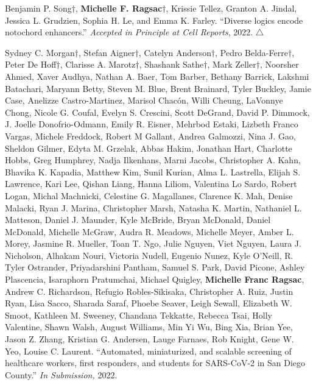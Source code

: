 \documentclass[11pt]{formatting-template}
\begin{document}
\begin{vita}
\noindent Benjamin P. Song$\dagger$, \textbf{Michelle F. Ragsac}$\dagger$, Krissie Tellez, Granton A. Jindal, Jessica L. Grudzien, Sophia H. Le, and Emma K. Farley. ``Diverse logics encode notochord enhancers.'' \textit{Accepted in Principle at Cell Reports}, 2022. $\triangle$ \newline

\noindent Sydney C. Morgan$\dagger$, Stefan Aigner$\dagger$, Catelyn Anderson$\dagger$, Pedro Belda-Ferre$\dagger$, Peter De Hoff$\dagger$, Clarisse A. Marotz$\dagger$, Shashank Sathe$\dagger$, Mark Zeller$\dagger$, Noorsher Ahmed, Xaver Audhya, Nathan A. Baer, Tom Barber, Bethany Barrick, Lakshmi Batachari, Maryann Betty, Steven M. Blue, Brent Brainard, Tyler Buckley, Jamie Case, Anelizze Castro-Martinez, Marisol Chacón, Willi Cheung, LaVonnye Chong, Nicole G. Coufal, Evelyn S. Crescini, Scott DeGrand, David P. Dimmock, J. Joelle Donofrio-Odmann, Emily R. Eisner, Mehrbod Estaki, Lizbeth Franco Vargas, Michele Freddock, Robert M Gallant, Andrea Galmozzi, Nina J. Gao, Sheldon Gilmer, Edyta M. Grzelak, Abbas Hakim, Jonathan Hart, Charlotte Hobbs, Greg Humphrey, Nadja Ilkenhans, Marni Jacobs, Christopher A. Kahn, Bhavika K. Kapadia, Matthew Kim, Sunil Kurian, Alma L. Lastrella, Elijah S. Lawrence, Kari Lee, Qishan Liang, Hanna Liliom, Valentina Lo Sardo, Robert Logan, Michal Machnicki, Celestine G. Magallanes, Clarence K. Mah, Denise Malacki, Ryan J. Marina, Christopher Marsh, Natasha K. Martin, Nathaniel L. Matteson, Daniel J. Maunder, Kyle McBride, Bryan McDonald, Daniel McDonald, Michelle McGraw, Audra R. Meadows, Michelle Meyer, Amber L. Morey, Jasmine R. Mueller, Toan T. Ngo, Julie Nguyen, Viet Nguyen, Laura J. Nicholson, Alhakam Nouri, Victoria Nudell, Eugenio Nunez, Kyle O'Neill, R. Tyler Ostrander, Priyadarshini Pantham, Samuel S. Park, David Picone, Ashley Plascencia, Isaraphorn Pratumchai, Michael Quigley, \textbf{Michelle Franc Ragsac}, Andrew C. Richardson, Refugio Robles-Sikisaka, Christopher A. Ruiz, Justin Ryan, Lisa Sacco, Sharada Saraf, Phoebe Seaver, Leigh Sewall, Elizabeth W. Smoot, Kathleen M. Sweeney, Chandana Tekkatte, Rebecca Tsai, Holly Valentine, Shawn Walsh, August Williams, Min Yi Wu, Bing Xia, Brian Yee, Jason Z. Zhang, Kristian G. Andersen, Lauge Farnaes, Rob Knight, Gene W. Yeo, Louise C. Laurent. ``Automated, miniaturized, and scalable screening of healthcare workers, first responders, and students for SARS-CoV-2 in San Diego County.'' \textit{In Submission,} 2022.


\end{vita}
\end{document}
